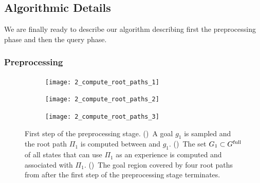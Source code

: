 \documentclass[a4paper]{report}
\begin{document}
\subsection{Algorithmic Details}
We are finally ready to describe our algorithm describing first the preprocessing phase and then the query phase.

\subsubsection{Preprocessing}
\begin{figure}[t]
    \centering
    \begin{subfigure}{.47\textwidth}
         \texttt{[image: 2\_compute\_root\_paths\_1]}
        \caption{}
        \label{fig:crp1}
    \end{subfigure}
    \hspace{4mm}
    \begin{subfigure}{0.47\textwidth}
         \texttt{[image: 2\_compute\_root\_paths\_2]}
        \caption{}
        \label{fig:crp2}
    \end{subfigure}
    \hspace{4mm}
    \begin{subfigure}{0.48\textwidth}
         \texttt{[image: 2\_compute\_root\_paths\_3]}
        \caption{}
        \label{fig:crp3}
    \end{subfigure}
    \caption{\CaptionTextSize
    First step of the preprocessing stage.
    ()~A goal $g_1$ is sampled and the root path $\Pi_1$ is computed between \Shome and $g_1$.
    ()~The set $G_1 \subset G^{\textrm{full}}$ of all states that can use $\Pi_1$ as an experience is computed and associated with $\Pi_1$.
    ()~The goal region covered by four root paths from \Shome after the first step of the preprocessing stage terminates.
    }
    \label{fig:crp}
\end{figure}
\end{document}
